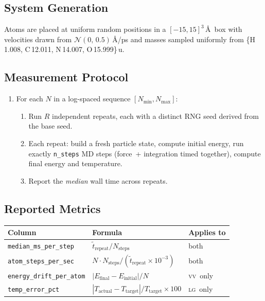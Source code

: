 \documentclass[11pt,a4paper]{article}
\theoremstyle{definition}
\theoremstyle{plain}
\newcommand{\VV}{\textsc{vv}}
\newcommand{\LG}{\textsc{lg}}
\begin{document}
\subsection{System Generation}

Atoms are placed at uniform random positions in a $[-15, 15]^3$\,\AA\ box
with velocities drawn from $\mathcal{N}(0,\,0.5)$\,\AA/ps and masses
sampled uniformly from \{H\,1.008, C\,12.011, N\,14.007, O\,15.999\}\,u.

\subsection{Measurement Protocol}

\begin{enumerate}
  \item For each $N$ in a log-spaced sequence $[N_{\min}, N_{\max}]$:
  \begin{enumerate}
	\item Run $R$ independent repeats, each with a distinct RNG seed derived
	  from the base seed.
	\item Each repeat: build a fresh particle state, compute initial energy,
	  run exactly \texttt{n\_steps} MD steps (force~+ integration timed
	  together), compute final energy and temperature.
	\item Report the \emph{median} wall time across repeats.
  \end{enumerate}
\end{enumerate}

\subsection{Reported Metrics}

\begin{center}
\begin{tabular}{lll}
\toprule
Column & Formula & Applies to \\
\midrule
\texttt{median\_ms\_per\_step}
  & $\tilde{t}_{\mathrm{repeat}} / N_{\mathrm{steps}}$ & both \\
\texttt{atom\_steps\_per\_sec}
  & $N \cdot N_{\mathrm{steps}} / (\tilde{t}_{\mathrm{repeat}} \times 10^{-3})$
  & both \\
\texttt{energy\_drift\_per\_atom}
  & $|E_{\mathrm{final}} - E_{\mathrm{initial}}| / N$
  & \VV\ only \\
\texttt{temp\_error\_pct}
  & $|T_{\mathrm{actual}} - T_{\mathrm{target}}| / T_{\mathrm{target}} \times 100$
  & \LG\ only \\
\bottomrule
\end{tabular}
\end{center}
\end{document}
